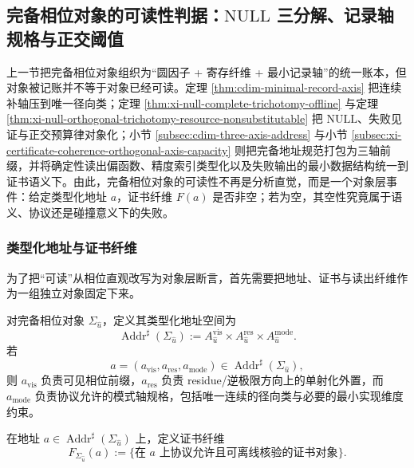 \subsection{完备相位对象的可读性判据：\texorpdfstring{$\mathrm{NULL}$}{NULL} 三分解、记录轴规格与正交阈值}\label{subsec:typed-address-biaxial-completion-readability-criteria}
上一节把完备相位对象组织为“圆因子 + 寄存纤维 + 最小记录轴”的统一账本，但对象被记账并不等于对象已经可读。定理 \ref{thm:cdim-minimal-record-axis} 把连续补轴压到唯一径向类；定理 \ref{thm:xi-null-complete-trichotomy-offline} 与定理 \ref{thm:xi-null-orthogonal-trichotomy-resource-nonsubstitutable} 把 \(\mathrm{NULL}\)、失败见证与正交预算律对象化；小节 \ref{subsec:cdim-three-axis-address} 与小节 \ref{subsec:xi-certificate-coherence-orthogonal-axis-capacity} 则把完备地址规范打包为三轴前缀，并将确定性读出偏函数、精度索引类型化以及失败输出的最小数据结构统一到证书语义下。由此，完备相位对象的可读性不再是分析直觉，而是一个对象层事件：给定类型化地址 \(a\)，证书纤维 \(F(a)\) 是否非空；若为空，其空性究竟属于语义、协议还是碰撞意义下的失败。

\subsubsection{类型化地址与证书纤维}\label{subsubsec:typed-address-biaxial-completion-address-fiber}
为了把“可读”从相位直观改写为对象层断言，首先需要把地址、证书与读出纤维作为一组独立对象固定下来。

\begin{definition}[三轴地址]\label{def:typed-address-biaxial-completion-three-axis-address}
对完备相位对象 \(\Sigma_{\hat u}\)，定义其类型化地址空间为
\[
\operatorname{Addr}^{\sharp}(\Sigma_{\hat u})
:=
A^{\mathrm{vis}}_{\hat u}\times A^{\mathrm{res}}_{\hat u}\times A^{\mathrm{mode}}_{\hat u}.
\]
若
\[
a=(a_{\mathrm{vis}},a_{\mathrm{res}},a_{\mathrm{mode}})
\in \operatorname{Addr}^{\sharp}(\Sigma_{\hat u}),
\]
则 \(a_{\mathrm{vis}}\) 负责可见相位前缀，\(a_{\mathrm{res}}\) 负责 residue/逆极限方向上的单射化外置，而 \(a_{\mathrm{mode}}\) 负责协议允许的模式轴规格，包括唯一连续的径向类与必要的最小实现维度约束。
\end{definition}

\begin{definition}[可读证书纤维]\label{def:typed-address-biaxial-completion-certificate-fiber}
在地址 \(a\in \operatorname{Addr}^{\sharp}(\Sigma_{\hat u})\) 上，定义证书纤维
\[
F_{\Sigma_{\hat u}}(a)
:=
\{\text{在 }a\text{ 上协议允许且可离线核验的证书对象}\}.
\]
\end{definition}


